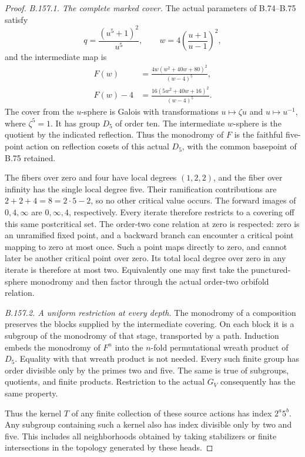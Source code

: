 \begin{proof}
\emph{B.157.1. The complete marked cover.}
The actual parameters of B.74--B.75 satisfy
\[
 q=\frac{(u^5+1)^2}{u^5},\qquad
 w=4\left(\frac{u+1}{u-1}\right)^2,
\]
and the intermediate map is
\begin{equation}\label{eq:B157-map}
\begin{aligned}
 F(w)&=\frac{4w(w^2+40w+80)^2}{(w-4)^5},\\
 F(w)-4&=\frac{16(5w^2+40w+16)^2}{(w-4)^5}.
\end{aligned}
\end{equation}
The cover from the \(u\)-sphere is Galois with transformations
\(u\mapsto\zeta u\) and \(u\mapsto u^{-1}\), where \(\zeta^5=1\).
It has group \(D_5\) of order ten. The intermediate \(w\)-sphere is
the quotient by the indicated reflection. Thus the monodromy of
\(F\) is the faithful five-point action on reflection cosets of
this actual \(D_5\), with the common basepoint of B.75 retained.

The fibers over zero and four have local degrees \((1,2,2)\),
and the fiber over infinity has the single local degree five.
Their ramification contributions are \(2+2+4=8=2\cdot5-2\),
so no other critical value occurs. The forward images of
\(0,4,\infty\) are \(0,\infty,4\), respectively. Every iterate
therefore restricts to a covering off this same postcritical set.
The order-two cone relation at zero is respected: zero is an
unramified fixed point, and a backward branch can encounter a
critical point mapping to zero at most once. Such a point maps
directly to zero, and cannot later be another critical point
over zero. Its total local degree over zero in any iterate is
therefore at most two. Equivalently one may first take the
punctured-sphere monodromy and then factor through the actual
order-two orbifold relation.

\emph{B.157.2. A uniform restriction at every depth.}
The monodromy of a composition preserves the blocks supplied by
the intermediate covering. On each block it is a subgroup of the
monodromy of that stage, transported by a path. Induction embeds
the monodromy of \(F^n\) into the \(n\)-fold permutational wreath
product of \(D_5\). Equality with that wreath product is not needed.
Every such finite group has order divisible only by the primes
two and five. The same is true of subgroups, quotients, and finite
products. Restriction to the actual \(G_V\) consequently has the
same property.

Thus the kernel \(T\) of any finite collection of these source
actions has index \(2^a5^b\). Any subgroup containing such a
kernel also has index divisible only by two and five. This
includes all neighborhoods obtained by taking stabilizers or
finite intersections in the topology generated by these heads.


\end{proof}
